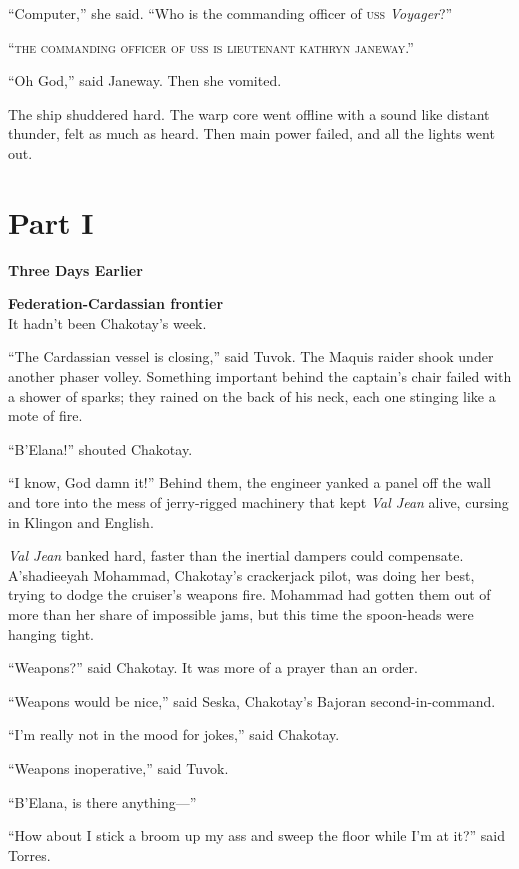 \documentclass[twoside,letterpaper,12pt]{memoir}
\begin{document}
``Computer,'' she said. ``Who is the commanding officer of \textsc{uss} \textit{Voyager}?''

``\textsc{the commanding officer of uss}  \textsc{is lieutenant kathryn janeway}.''

``Oh God,'' said Janeway. Then she vomited.

The ship shuddered hard. The warp core went offline with a sound like distant thunder, felt as much as heard. Then main power failed, and all the lights went out.

\chapter*{Part I}

\textbf{Three Days Earlier }

\noindent\textbf{Federation-Cardassian frontier}\\

\noindent It hadn't been Chakotay's week.

``The Cardassian vessel is closing,'' said Tuvok. The Maquis raider shook under another phaser volley. Something important behind the captain's chair failed with a shower of sparks; they rained on the back of his neck, each one stinging like a mote of fire.

``B'Elana!'' shouted Chakotay.

``I know, God damn it!'' Behind them, the engineer yanked a panel off the wall and tore into the mess of jerry-rigged machinery that kept \textit{Val Jean} alive, cursing in Klingon and English.

\textit{Val Jean} banked hard, faster than the inertial dampers could compensate. A'shadieeyah Mohammad, Chakotay's crackerjack pilot, was doing her best, trying to dodge the cruiser's weapons fire. Mohammad had gotten them out of more than her share of impossible jams, but this time the spoon-heads were hanging tight.

``Weapons?'' said Chakotay. It was more of a prayer than an order.

``Weapons would be nice,'' said Seska, Chakotay's Bajoran second-in-command.

``I'm really not in the mood for jokes,'' said Chakotay.

``Weapons inoperative,'' said Tuvok.

``B'Elana, is there anything---''

``How about I stick a broom up my ass and sweep the floor while I'm at it?'' said Torres.
\end{document}
